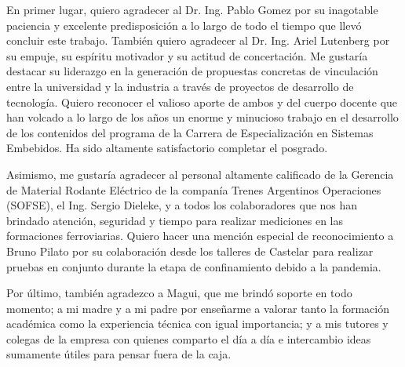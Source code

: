 \documentclass[
11pt, %
spanish,
singlespacing, %
parskip, %
headsepline, %
]{MastersDoctoralThesis} %
\begin{document}
\begin{acknowledgements}
\vspace{1.5cm}

En primer lugar, quiero agradecer al Dr. Ing. Pablo Gomez por su inagotable paciencia y excelente predisposición a lo largo de todo el tiempo que llevó concluir este trabajo. También quiero agradecer al Dr. Ing. Ariel Lutenberg por su empuje, su espíritu motivador y su actitud de concertación. Me gustaría destacar su liderazgo en la generación de propuestas concretas de vinculación entre la universidad y la industria a través de proyectos de desarrollo de tecnología. Quiero reconocer el valioso aporte de ambos y del cuerpo docente que han volcado a lo largo de los años un enorme y minucioso trabajo en el desarrollo de los contenidos del programa de la Carrera de Especialización en Sistemas Embebidos. Ha sido altamente satisfactorio completar el posgrado.

Asimismo, me gustaría agradecer al personal altamente calificado de la Gerencia de Material Rodante Eléctrico de la companía Trenes Argentinos Operaciones (SOFSE), el Ing. Sergio Dieleke, y a todos los colaboradores que nos han brindado atención, seguridad y tiempo para realizar mediciones en las formaciones ferroviarias. Quiero hacer una mención especial de reconocimiento a Bruno Pilato por su colaboración desde los talleres de Castelar para realizar pruebas en conjunto durante la etapa de confinamiento debido a la pandemia. 

Por último, también agradezco a Magui, que me brindó soporte en 
todo momento; a mi madre y a mi padre por enseñarme a valorar tanto la formación académica como la experiencia técnica con igual importancia; y a mis tutores y colegas de la empresa con quienes comparto el día a día e intercambio ideas sumamente útiles para pensar fuera de la caja.


\end{acknowledgements}


\tableofcontents %


\end{document}
